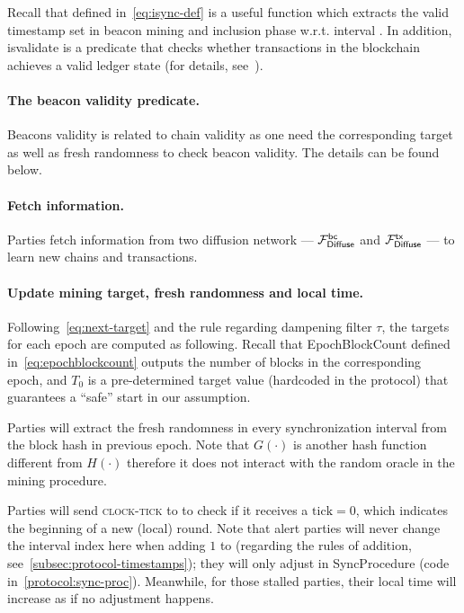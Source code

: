Recall that \Isync{\interval} defined in~\cref{eq:isync-def} is a useful function which extracts the valid timestamp set in beacon mining and inclusion phase w.r.t. interval \interval.
%
In addition, \textsf{isvalidate} is a predicate that checks whether transactions in the blockchain achieves a valid ledger state (for details, see~\cite{C:BMTZ17}).



\paragraph{The beacon validity predicate.}
%
Beacons validity is related to chain validity as one need the corresponding target as well as fresh randomness to check beacon validity.
%
The details can be found below.



\paragraph{Fetch information.}
%
Parties fetch information from two diffusion network --- $\mathcal{F}_{\mathsf{Diffuse}}^{\mathsf{bc}}$ and $\mathcal{F}_{\mathsf{Diffuse}}^{\mathsf{tx}}$ --- to learn new chains and transactions.



\paragraph{Update mining target, fresh randomness and local time.}
%
Following~\cref{eq:next-target} and the rule regarding dampening filter $\tau$, the targets for each epoch \epoch are computed as following.
%
Recall that \textsf{EpochBlockCount} defined in~\cref{eq:epochblockcount} outputs the number of blocks in the corresponding epoch, and $T_0$ is a pre-determined target value (hardcoded in the protocol) that guarantees a ``safe'' start in our assumption.



Parties will extract the fresh randomness in every synchronization interval from the block hash in previous epoch.
%
Note that $G(\cdot)$ is another hash function different from $H(\cdot)$ therefore it does not interact with the random oracle \funcRO in the mining procedure.



Parties will send \textsc{clock-tick} to \funcImpClock to check if it receives a $\mathrm{tick} = 0$, which indicates the beginning of a new (local) round.
%
Note that alert parties will never change the interval index \interval here when adding $1$ to \localTime (regarding the rules of addition, see~\cref{subsec:protocol-timestamps}); they will only adjust \interval in \textsf{SyncProcedure} (code in~\cref{protocol:sync-proc}).
%
Meanwhile, for those stalled parties, their local time will increase as if no adjustment happens.

